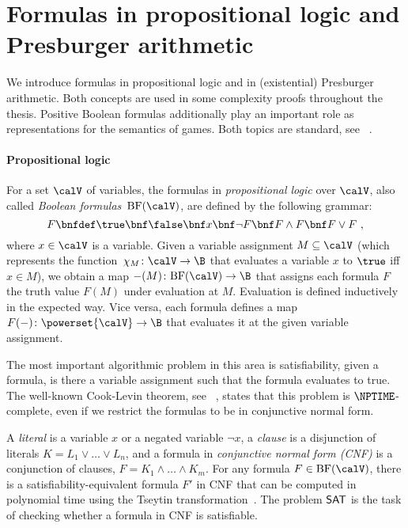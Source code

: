 \documentclass[../../diss.tex]{subfiles}
\begin{document}
\section{Formulas in propositional logic and Presburger arithmetic}%
\label{Section:Formulas}%

We introduce formulas in propositional logic and in (existential) Presburger arithmetic.
Both concepts are used in some complexity proofs throughout the thesis.
Positive Boolean formulas additionally play an important role as representations for the semantics of games.
Both topics are standard, see \eg~\cite{Enderton72}.

\paragraph{Propositional logic}

For a set $\vars$ of variables, the formulas in \emph{propositional logic} over $\vars$, also called \emph{Boolean formulas}~$\BF(\vars)$, are defined by the following grammar:
\[
    F \bnfdef \true \bnf \false \bnf x \bnf \neg F \bnf F \wedge F \bnf F \vee F
    \ ,
\]
where $x \in \vars$ is a variable.
Given a variable assignment $M \subseteq \vars$ (which represents the function~$\chi_M \colon \vars \to \B$ that evaluates a variable $x$ to $\true$ iff $x \in M$), we obtain a map $-(M) \colon \BF(\vars) \to \B$ that assigns each formula $F$ the truth value $F(M)$ under evaluation at $M$.
Evaluation is defined inductively in the expected way.
Vice versa, each formula defines a map $F(-) \colon \powerset{\vars} \to \B$ that evaluates it at the given variable assignment.

The most important algorithmic problem in this area is satisfiability, given a formula, is there a variable assignment such that the formula evaluates to true.
The well-known Cook-Levin theorem, see \eg~\cite{Kozen06}, states that this problem is $\NPTIME$-complete, even if we restrict the formulas to be in conjunctive normal form.


A \emph{literal} is a variable $x$ or a negated variable $\neg x$, a \emph{clause} is a disjunction of literals $K = L_1 \vee \ldots \vee L_n$, and a formula in \emph{conjunctive normal form (CNF)} is a conjunction of clauses, $F = K_1 \wedge \ldots \wedge K_m$.
For any formula $F \in \BF(\vars)$, there is a satisfiability-equivalent formula $F'$ in CNF that can be computed in polynomial time using the Tseytin transformation~\cite{Tseytin68}.
The problem $\mathsf{SAT}$ is the task of checking whether a formula in CNF is satisfiable.
\end{document}
